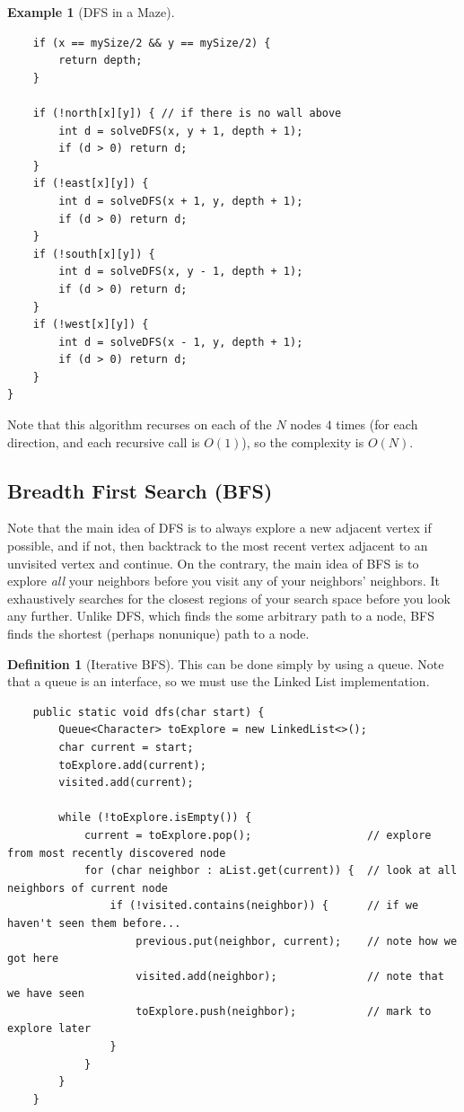 \documentclass{article}
\theoremstyle{definition}
\newtheorem{example}{Example}[section]
\theoremstyle{remark}
\theoremstyle{definition}
\newtheorem{definition}{Definition}[section]
\begin{document}
\begin{example}[DFS in a Maze]
\begin{verbatim}
    if (x == mySize/2 && y == mySize/2) {
        return depth; 
    }
    
    if (!north[x][y]) { // if there is no wall above
        int d = solveDFS(x, y + 1, depth + 1); 
        if (d > 0) return d; 
    }
    if (!east[x][y]) {
        int d = solveDFS(x + 1, y, depth + 1); 
        if (d > 0) return d; 
    }
    if (!south[x][y]) {
        int d = solveDFS(x, y - 1, depth + 1); 
        if (d > 0) return d; 
    }
    if (!west[x][y]) {
        int d = solveDFS(x - 1, y, depth + 1); 
        if (d > 0) return d; 
    }
}
\end{verbatim}
Note that this algorithm recurses on each of the $N$ nodes $4$ times (for each direction, and each recursive call is $O(1)$), so the complexity is $O(N)$. 
\end{example}


\subsection{Breadth First Search (BFS)}

Note that the main idea of DFS is to always explore a new adjacent vertex if possible, and if not, then backtrack to the most recent vertex adjacent to an unvisited vertex and continue. On the contrary, the main idea of BFS is to explore \textit{all} your neighbors before you visit any of your neighbors' neighbors. It exhaustively searches for the closest regions of your search space before you look any further. Unlike DFS, which finds the some arbitrary path to a node, BFS finds the shortest (perhaps nonunique) path to a node. 

\begin{definition}[Iterative BFS]
This can be done simply by using a queue. Note that a queue is an interface, so we must use the Linked List implementation. 
\begin{verbatim}
    public static void dfs(char start) {
        Queue<Character> toExplore = new LinkedList<>(); 
        char current = start; 
        toExplore.add(current); 
        visited.add(current); 
        
        while (!toExplore.isEmpty()) {
            current = toExplore.pop();                  // explore from most recently discovered node
            for (char neighbor : aList.get(current)) {  // look at all neighbors of current node 
                if (!visited.contains(neighbor)) {      // if we haven't seen them before...
                    previous.put(neighbor, current);    // note how we got here 
                    visited.add(neighbor);              // note that we have seen
                    toExplore.push(neighbor);           // mark to explore later
                }
            }
        }
    }
\end{verbatim}
\end{definition}
\end{document}

